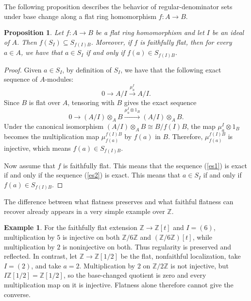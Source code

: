 \documentclass[11pt,leqno]{amsart}
\newtheorem{proposition}[theorem]{Proposition}
\theoremstyle{definition}
\newtheorem{example}[theorem]{Example}
\numberwithin{equation}{section}
\begin{document}
The following proposition describes the behavior of regular-denominator sets under base change along a flat ring homomorphism $f\colon A\to B$.


\begin{proposition}
    Let $f\colon A \rightarrow B$ be a flat ring homomorphism and let $I$ be an ideal of $A$. Then $f(S_I) \subseteq S_{f(I)B}$. Moreover, if $f$ is faithfully flat, then for every $a \in A$, we have that $a \in S_I$ if and only if $f(a) \in S_{f(I)B}$. 
\end{proposition}

\begin{proof}
Given $a\in S_I$, by definition of $S_I$, we have that the following exact sequence of $A$-modules:
  \begin{equation}\label{es1}
      0 \longrightarrow A/I \xrightarrow{\mu^{I}_a} A/I.
  \end{equation}
  Since $B$ is flat over $A$, tensoring with $B$ gives the exact sequence 
  \begin{equation}\label{es2}
  0 \longrightarrow (A/I) \otimes_A B \xrightarrow{\mu^I_a \otimes 1_B} (A/I) \otimes_A B.
  \end{equation}
  Under the canonical isomorphism $(A/I) \otimes_A B \cong B/f(I)B$, the map $\mu^{I}_a \otimes 1_B$ becomes the multiplication map $\mu^{f(I)B}_{f(a)}$ by $f(a)$ in $B$. Therefore, $\mu^{f(I)B}_{f(a)}$ is injective, which means $f(a)\in S_{f(I)B}$.

 Now assume that $f$ is faithfully flat. This means that the sequence (\ref{es1}) is exact if and only if the sequence (\ref{es2}) is exact. This means that $a \in S_I$ if and only if $f(a) \in S_{f(I)B}$.
\end{proof}

The difference between what flatness preserves and what faithful flatness can recover already appears in a very simple example over $\mathds{Z}$.

\begin{example}
For the faithfully flat extension $\mathds Z\to\mathds Z[t]$ and $I=(6)$, multiplication by $5$ is injective on both $\mathds Z/6\mathds Z$ and $(\mathds Z/6\mathds Z)[t]$, while multiplication by $2$ is noninjective on both. Thus regularity is preserved and reflected. In contrast, let $\mathds Z\to\mathds Z[1/2]$ be the flat, nonfaithful localization, take $I=(2)$, and take $a=2$. Multiplication by $2$ on $\mathds Z/2\mathds Z$ is not injective, but $I\mathds Z[1/2]=\mathds Z[1/2]$, so the base-changed quotient is zero and every multiplication map on it is injective. Flatness alone therefore cannot give the converse.
\end{example}
\end{document}

